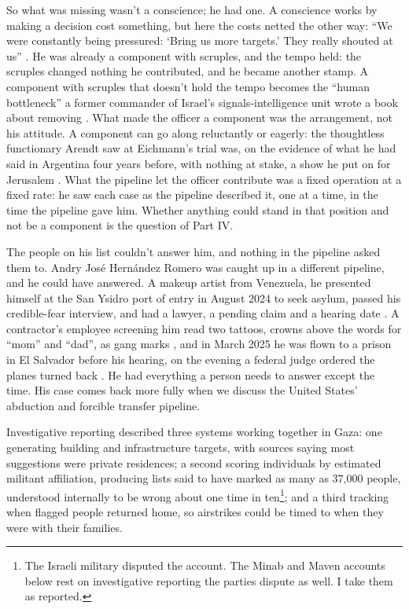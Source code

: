So what was missing wasn't a conscience; he had one. A conscience works by making a decision cost something, but here the costs netted the other way: “We were constantly being pressured: ‘Bring us more targets.’ They really shouted at us” \autocite{abraham2024lavender}. He was already a component with scruples, and the tempo held: the scruples changed nothing he contributed, and he became another stamp. A component with scruples that doesn't hold the tempo becomes the “human bottleneck” a former commander of Israel's signals-intelligence unit wrote a book about removing \autocite{ys2021humanmachine}. What made the officer a component was the arrangement, not his attitude. A component can go along reluctantly or eagerly: the thoughtless functionary Arendt saw at Eichmann's trial \autocite{arendt1963eichmann} was, on the evidence of what he had said in Argentina four years before, with nothing at stake, a show he put on for Jerusalem \autocite{stangneth2014eichmann}. What the pipeline let the officer contribute was a fixed operation at a fixed rate: he saw each case as the pipeline described it, one at a time, in the time the pipeline gave him. Whether anything could stand in that position and not be a component is the question of Part IV.

The people on his list couldn't answer him, and nothing in the pipeline asked them to. Andry José Hernández Romero was caught up in a different pipeline, and he could have answered. A makeup artist from Venezuela, he presented himself at the San Ysidro port of entry in August 2024 to seek asylum, passed his credible-fear interview, and had a lawyer, a pending claim and a hearing date \autocite{LULAC2025HernandezRomero,Vega2025HernandezRomero}. A contractor's employee screening him read two tattoos, crowns above the words for “mom” and “dad”, as gang marks \autocite{Palomera2025Blade}, and in March 2025 he was flown to a prison in El Salvador before his hearing, on the evening a federal judge ordered the planes turned back \autocite{jgg2025contempt}. He had everything a person needs to answer except the time. His case comes back more fully when we discuss the United States' abduction and forcible transfer pipeline.

Investigative reporting described three systems working together in Gaza: one generating building and infrastructure targets, with sources saying most suggestions were private residences; a second scoring individuals by estimated militant affiliation, producing lists said to have marked as many as 37,000 people, understood internally to be wrong about one time in ten\footnote{The Israeli military disputed the account. The Minab and Maven accounts below rest on investigative reporting the parties dispute as well. I take them as reported.}; and a third tracking when flagged people returned home, so airstrikes could be timed to when they were with their families.

